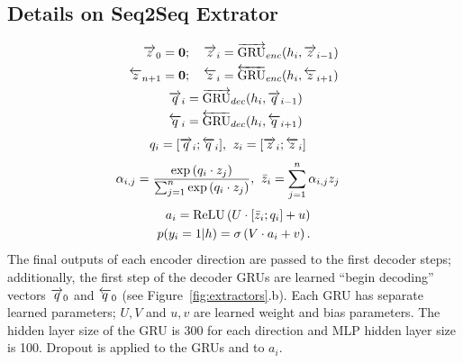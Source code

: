 \subsection{Details on Seq2Seq Extrator} \label{app:s2sextractor}
\begin{align}
    \rEncExtHidden_0 = \textbf{0}&;\quad \rEncExtHidden_i = \rgru_{enc}(\sentEmb[i], \rEncExtHidden_{i-1}) \\
    \lEncExtHidden_{\docSize + 1} = \textbf{0}&;\quad  \lEncExtHidden_i = \lgru_{enc}(\sentEmb[i], \lEncExtHidden_{i+1}) \\
    \rDecExtHidden_i &= \rgru_{dec}(\sentEmb[i], \rDecExtHidden_{i-1}) \\
    \lDecExtHidden_i &= \lgru_{dec}(\sentEmb[i], \lDecExtHidden_{i+1}) 
\end{align}
\begin{align}
 q_i = [\overrightarrow{q}_i; \overleftarrow{q}_i], &\;\;
 z_i = [\overrightarrow{z}_i; \overleftarrow{z}_i] 
\end{align}
\begin{align}
 \alpha_{i,j} = 
   \frac{\exp \left(q_i \cdot z_j \right)}{
   \sum_{j=1}^{n}\exp\left(q_i \cdot z_j\right)}, 
& \;\; \bar{z}_i = \sum_{j=1}^{n} \alpha_{i,j} z_j 
\end{align}
\begin{align}
   \logits_i = \relu\left(U \cdot [\attnExtHidden_i; \decExtHidden_i] + u \right)&\\
   p(\slabel_i=1|\sentvec) = \sigma\left(V\cdot \logits_i + v  \right).
\end{align}
The final outputs of each encoder direction are passed to the first decoder
steps; additionally, the first step of the decoder GRUs are learned 
``begin decoding'' vectors $\overrightarrow{q}_0$ and $\overleftarrow{q}_0$ 
(see Figure~\ref{fig:extractors}.b).
Each GRU has separate learned 
parameters; $U, V$ and $u, v$ are learned weight and bias parameters.
The hidden layer size of the GRU is 300 for each direction and MLP hidden layer
size is 100. Dropout is applied to the GRUs and to $a_i$.

